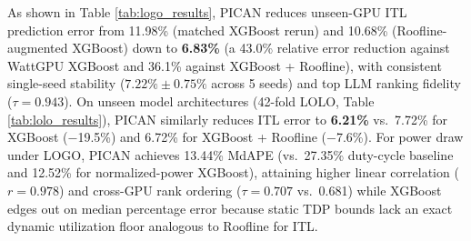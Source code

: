 \documentclass[preprint,12pt]{elsarticle}
\begin{document}
As shown in Table \ref{tab:logo_results}, PICAN reduces unseen-GPU ITL prediction error from 11.98\% (matched XGBoost rerun) and 10.68\% (Roofline-augmented XGBoost) down to \textbf{6.83\%} (a 43.0\% relative error reduction against WattGPU XGBoost and 36.1\% against XGBoost + Roofline), with consistent single-seed stability ($7.22\% \pm 0.75\%$ across 5 seeds) and top LLM ranking fidelity ($\tau = 0.943$). On unseen model architectures (42-fold LOLO, Table \ref{tab:lolo_results}), PICAN similarly reduces ITL error to \textbf{6.21\%} vs.\ 7.72\% for XGBoost ($-$19.5\%) and 6.72\% for XGBoost + Roofline ($-$7.6\%). For power draw under LOGO, PICAN achieves 13.44\% MdAPE (vs.\ 27.35\% duty-cycle baseline and 12.52\% for normalized-power XGBoost), attaining higher linear correlation ($r = 0.978$) and cross-GPU rank ordering ($\tau = 0.707$ vs.\ 0.681) while XGBoost edges out on median percentage error because static TDP bounds lack an exact dynamic utilization floor analogous to Roofline for ITL.

\begin{table}[h]
\centering
\caption{Per-GPU zero-shot Inter-Token Latency prediction error across all 8 held-out GPU architectures under LOGO cross-validation, comparing Matched XGBoost, XGBoost + Roofline, and 5-seed SHIFT-GPU (PICAN).}
\label{tab:per_gpu_results}
\end{table}
\end{document}
